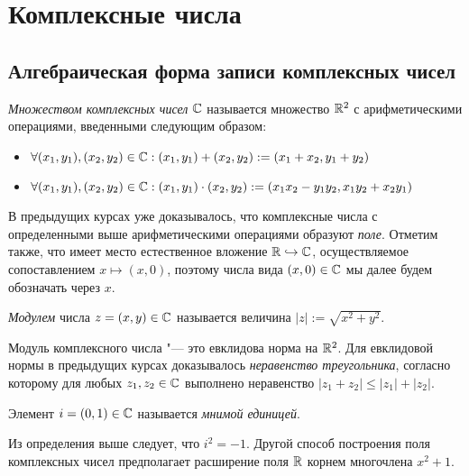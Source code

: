 \section{Комплексные числа}

\subsection{Алгебраическая форма записи комплексных чисел}

\begin{definition}
	\textit{Множеством комплексных чисел} $\mathbb{C}$ называется множество $\mathbb{R}^2$ с арифметическими операциями, введенными следующим образом:
	\begin{itemize}
		\item $\forall (x_1, y_1), (x_2, y_2) \in \mathbb{C}: (x_1, y_1) + (x_2, y_2) := (x_1 + x_2, y_1 + y_2)$
		\item $\forall (x_1, y_1), (x_2, y_2) \in \mathbb{C}: (x_1, y_1)\cdot(x_2, y_2) := (x_1x_2 - y_1y_2, x_1y_2 + x_2y_1)$
	\end{itemize}
\end{definition}

\begin{note}
	В предыдущих курсах уже доказывалось, что комплексные числа с определенными выше арифметическими операциями образуют \textit{поле}. Отметим также, что имеет место естественное вложение $\mathbb{R} \hookrightarrow \mathbb{C}$, осуществляемое сопоставлением $x \mapsto (x, 0)$, поэтому числа вида $(x, 0) \in \mathbb{C}$ мы далее будем обозначать через $x$.
\end{note}

\begin{definition}
	\textit{Модулем} числа $z = (x, y) \in \mathbb{C}$ называется величина $|z| := \sqrt{x^2 + y^2}$.
\end{definition}

\begin{note}
	Модуль комплексного числа "--- это евклидова норма на $\mathbb{R}^2$. Для евклидовой нормы в предыдущих курсах доказывалось \textit{неравенство треугольника}, согласно которому для любых $z_1, z_2 \in \mathbb{C}$ выполнено неравенство $|z_1 + z_2| \le |z_1| + |z_2|$.
\end{note}

\begin{definition}
	Элемент $i = (0, 1) \in \mathbb{C}$ называется \textit{мнимой единицей}.
\end{definition}

\begin{note}
	Из определения выше следует, что $i^2 = -1$. Другой способ построения поля комплексных чисел предполагает расширение поля $\mathbb{R}$ корнем многочлена $x^2 + 1$.
\end{note}

